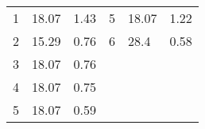 \documentclass[oneside,onecolumn]{article}
\begin{document}
\begin{table}[]
\begin{tabular}{llllll}
1                                                                                   & 18.07                                                                                                   & 1.43                                                                                   & 5                                                                                    & 18.07                                                                                                   & 1.22                                                                                   \\
2                                                                                   & 15.29                                                                                                   & 0.76                                                                                   & 6                                                                                    & 28.4                                                                                                    & 0.58                                                                                   \\
3                                                                                   & 18.07                                                                                                   & 0.76                                                                                   &                                                                                      &                                                                                                         &                                                                                        \\
4                                                                                   & 18.07                                                                                                   & 0.75                                                                                   &                                                                                      &                                                                                                         &                                                                                        \\
5                                                                                   & 18.07                                                                                                   & 0.59                                                                                   &                                                                                      &                                                                                                         &                                                                                        \\

\end{tabular}
\end{table}
\end{document}
